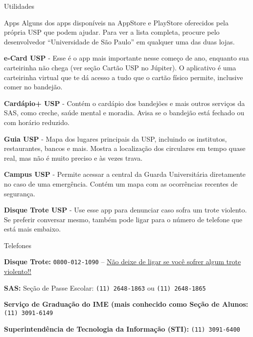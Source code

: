\begin{secao}{Utilidades}
\begin{subsecao}{Apps}
Alguns dos apps disponíveis na AppStore e PlayStore oferecidos pela própria USP
que podem ajudar. Para ver a lista completa, procure pelo desenvolvedor
``Universidade de São Paulo'' em qualquer uma das duas lojas.

{\bf e-Card USP} - Esse é o app mais importante nesse começo de ano, enquanto
sua carteirinha não chega (ver seção Cartão USP no Júpiter). O aplicativo é uma
carteirinha virtual que te dá acesso a tudo que o cartão físico permite,
inclusive comer no bandejão.

{\bf Cardápio+ USP} - Contém o cardápio dos bandejões e mais outros serviços
da SAS, como creche, saúde mental e moradia. Avisa se o bandejão está fechado
ou com horário reduzido.

{\bf Guia USP} - Mapa dos lugares principais da USP, incluindo os institutos,
restaurantes, bancos e mais. Mostra a localização dos circulares em tempo quase
real, mas não é muito preciso e às vezes trava.

{\bf Campus USP} - Permite acessar a central da Guarda Universitária
diretamente no caso de uma emergência. Contém um mapa com as ocorrências
recentes de segurança.

{\bf Disque Trote USP} - Use esse app para denunciar caso sofra um trote
violento. Se preferir conversar mesmo, também pode ligar para o número de
telefone que está mais embaixo.

\end{subsecao}

\begin{subsecao}{Telefones}

{\bf Disque Trote:} {\tt 0800-012-1090} --
\underline{Não deixe de ligar se você sofrer algum trote violento!!}

{\bf SAS:} Seção de Passe Escolar: {\tt (11) 2648-1863} ou {\tt (11) 2648-1865}

{\bf Serviço de Graduação do IME (mais conhecido como Seção de Alunos:} {\tt (11) 3091-6149}

{\bf Superintendência de Tecnologia da Informação (STI):} {\tt (11) 3091-6400}


\end{subsecao}
\end{secao}
